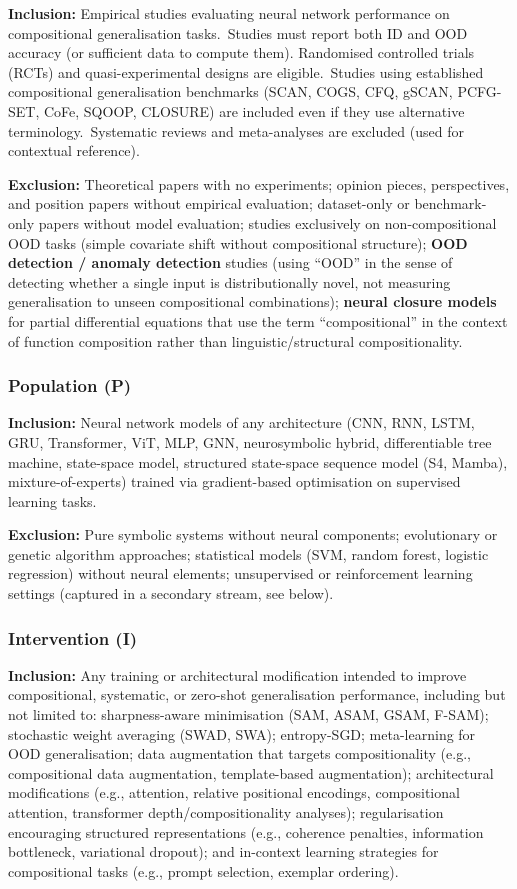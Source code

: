\textbf{Inclusion:} Empirical studies evaluating neural network performance on compositional generalisation tasks.\ Studies must report both ID and OOD accuracy (or sufficient data to compute them). Randomised controlled trials (RCTs) and quasi-experimental designs are eligible.\ Studies using established compositional generalisation benchmarks (SCAN, COGS, CFQ, gSCAN, PCFG-SET, CoFe, SQOOP, CLOSURE) are included even if they use alternative terminology.\ Systematic reviews and meta-analyses are excluded (used for contextual reference).

\textbf{Exclusion:} Theoretical papers with no experiments; opinion pieces, perspectives, and position papers without empirical evaluation; dataset-only or benchmark-only papers without model evaluation; studies exclusively on non-compositional OOD tasks (simple covariate shift without compositional structure); \textbf{OOD detection / anomaly detection} studies (using ``OOD'' in the sense of detecting whether a single input is distributionally novel, not measuring generalisation to unseen compositional combinations); \textbf{neural closure models} for partial differential equations that use the term ``compositional'' in the context of function composition rather than linguistic/structural compositionality.

\subsubsection{Population (P)}

\textbf{Inclusion:} Neural network models of any architecture (CNN, RNN, LSTM, GRU, Transformer, ViT, MLP, GNN, neurosymbolic hybrid, differentiable tree machine, state-space model, structured state-space sequence model (S4, Mamba), mixture-of-experts) trained via gradient-based optimisation on supervised learning tasks.

\textbf{Exclusion:} Pure symbolic systems without neural components; evolutionary or genetic algorithm approaches; statistical models (SVM, random forest, logistic regression) without neural elements; unsupervised or reinforcement learning settings (captured in a secondary stream, see below).

\subsubsection{Intervention (I)}

\textbf{Inclusion:} Any training or architectural modification intended to improve compositional, systematic, or zero-shot generalisation performance, including but not limited to: sharpness-aware minimisation (SAM, ASAM, GSAM, F-SAM); stochastic weight averaging (SWAD, SWA); entropy-SGD; meta-learning for OOD generalisation; data augmentation that targets compositionality (e.g., compositional data augmentation, template-based augmentation); architectural modifications (e.g., attention, relative positional encodings, compositional attention, transformer depth/compositionality analyses); regularisation encouraging structured representations (e.g., coherence penalties, information bottleneck, variational dropout); and in-context learning strategies for compositional tasks (e.g., prompt selection, exemplar ordering).

